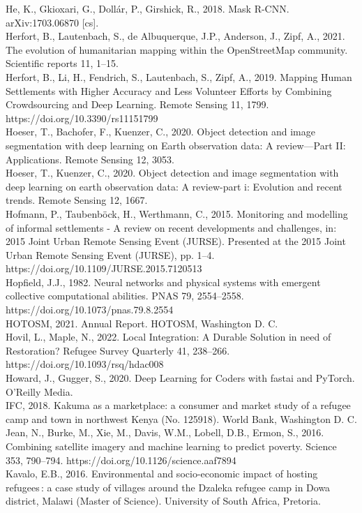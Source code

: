 \documentclass[11pt, a4paper, twoside]{report}
\begin{document}
He, K., Gkioxari, G., Dollár, P., Girshick, R., 2018. Mask R-CNN. arXiv:1703.06870 [cs].\\
Herfort, B., Lautenbach, S., de Albuquerque, J.P., Anderson, J., Zipf, A., 2021. The evolution of humanitarian mapping within the OpenStreetMap community. Scientific reports 11, 1–15.\\
Herfort, B., Li, H., Fendrich, S., Lautenbach, S., Zipf, A., 2019. Mapping Human Settlements with Higher Accuracy and Less Volunteer Efforts by Combining Crowdsourcing and Deep Learning. Remote Sensing 11, 1799. https://doi.org/10.3390/rs11151799\\
Hoeser, T., Bachofer, F., Kuenzer, C., 2020. Object detection and image segmentation with deep learning on Earth observation data: A review—Part II: Applications. Remote Sensing 12, 3053.\\
Hoeser, T., Kuenzer, C., 2020. Object detection and image segmentation with deep learning on earth observation data: A review-part i: Evolution and recent trends. Remote Sensing 12, 1667.\\
Hofmann, P., Taubenböck, H., Werthmann, C., 2015. Monitoring and modelling of informal settlements - A review on recent developments and challenges, in: 2015 Joint Urban Remote Sensing Event (JURSE). Presented at the 2015 Joint Urban Remote Sensing Event (JURSE), pp. 1–4. https://doi.org/10.1109/JURSE.2015.7120513\\
Hopfield, J.J., 1982. Neural networks and physical systems with emergent collective computational abilities. PNAS 79, 2554–2558. https://doi.org/10.1073/pnas.79.8.2554\\
HOTOSM, 2021. Annual Report. HOTOSM, Washington D. C.\\
Hovil, L., Maple, N., 2022. Local Integration: A Durable Solution in need of Restoration? Refugee Survey Quarterly 41, 238–266. https://doi.org/10.1093/rsq/hdac008\\
Howard, J., Gugger, S., 2020. Deep Learning for Coders with fastai and PyTorch. O’Reilly Media.\\
IFC, 2018. Kakuma as a marketplace: a consumer and market study of a refugee camp and town in northwest Kenya (No. 125918). World Bank, Washington D. C.\\
Jean, N., Burke, M., Xie, M., Davis, W.M., Lobell, D.B., Ermon, S., 2016. Combining satellite imagery and machine learning to predict poverty. Science 353, 790–794. https://doi.org/10.1126/science.aaf7894\\
Kavalo, E.B., 2016. Environmental and socio-economic impact of hosting refugees : a case study of villages around the Dzaleka refugee camp in Dowa district, Malawi (Master of Science). University of South Africa, Pretoria.\\
\end{document}
